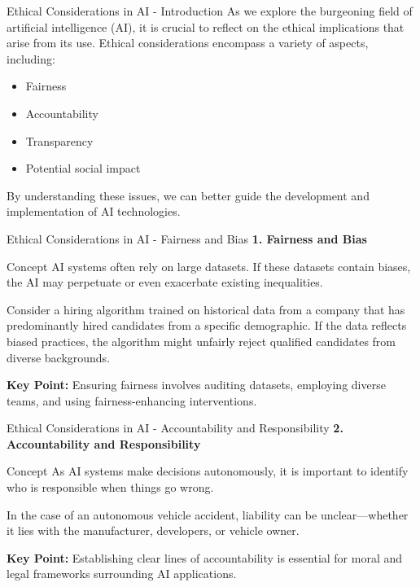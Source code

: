 \documentclass[aspectratio=169]{beamer}
\begin{document}
\begin{frame}[fragile]{Ethical Considerations in AI - Introduction}
    As we explore the burgeoning field of artificial intelligence (AI), it is crucial to reflect on the ethical implications that arise from its use. 
    Ethical considerations encompass a variety of aspects, including:
    \begin{itemize}
        \item Fairness
        \item Accountability
        \item Transparency
        \item Potential social impact
    \end{itemize}
    By understanding these issues, we can better guide the development and implementation of AI technologies.
\end{frame}

\begin{frame}[fragile]{Ethical Considerations in AI - Fairness and Bias}
    \textbf{1. Fairness and Bias}
    \begin{block}{Concept}
        AI systems often rely on large datasets. If these datasets contain biases, the AI may perpetuate or even exacerbate existing inequalities.
    \end{block}
    \begin{example}
        Consider a hiring algorithm trained on historical data from a company that has predominantly hired candidates from a specific demographic. If the data reflects biased practices, the algorithm might unfairly reject qualified candidates from diverse backgrounds.
    \end{example}
    \textbf{Key Point:} Ensuring fairness involves auditing datasets, employing diverse teams, and using fairness-enhancing interventions.
\end{frame}

\begin{frame}[fragile]{Ethical Considerations in AI - Accountability and Responsibility}
    \textbf{2. Accountability and Responsibility}
    \begin{block}{Concept}
        As AI systems make decisions autonomously, it is important to identify who is responsible when things go wrong.
    \end{block}
    \begin{example}
        In the case of an autonomous vehicle accident, liability can be unclear—whether it lies with the manufacturer, developers, or vehicle owner.
    \end{example}
    \textbf{Key Point:} Establishing clear lines of accountability is essential for moral and legal frameworks surrounding AI applications.
\end{frame}
\end{document}

